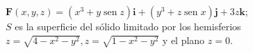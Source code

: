 \item $\mathbf{F}(x, y, z) = (x^3 + y \operatorname{sen} z)\mathbf{i} + (y^3 + z \operatorname{sen} x)\mathbf{j} + 3z\mathbf{k}$;\\
    $S$ es la superficie del sólido limitado por los hemisferios $z = \sqrt{4 - x^2 - y^2}, z = \sqrt{1 - x^2 - y^2}$ y el plano $z = 0$.
